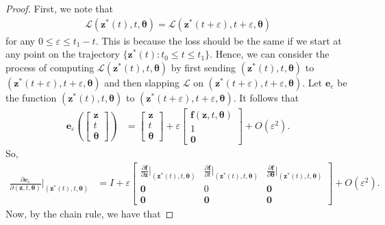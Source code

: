 \documentclass[10pt]{article}
\newcommand{\ve}[1]{\mathbf{#1}}
\newcommand{\ves}[1]{\boldsymbol{#1}}
\newcommand{\mcal}[1]{\mathcal{#1}}
\begin{document}
\begin{itemize}
\begin{proof}
    First, we note that
    \begin{align*}
      \mcal{L}(\ve{z}^*(t), t, \ves{\theta}) 
      = \mcal{L}(\ve{z}^*(t+\varepsilon), t + \varepsilon, \ves{\theta})
    \end{align*}
    for any $0 \leq \varepsilon \leq t_1 - t$. This is because the loss should be the same if we start at any point on the trajectory $\{ \ve{z}^*(t) : t_0 \leq t \leq t_1 \}$. Hence, we can consider the process of computing $\mcal{L}(\ve{z}^*(t), t, \ves{\theta})$ by first sending $(\ve{z}^*(t), t, \ves{\theta})$ to $(\ve{z}^*(t + \varepsilon), t + \varepsilon, \ves{\theta})$ and then slapping $\mcal{L}$ on $(\ve{z}^*(t + \varepsilon), t + \varepsilon, \ves{\theta})$. Let $\ve{e}_\varepsilon$ be the function $(\ve{z}^*(t), t, \ves{\theta})$ to $(\ve{z}^*(t + \varepsilon), t + \varepsilon, \ves{\theta})$. It follows that
    \begin{align*}
      \ve{e}_\varepsilon\left( \begin{bmatrix} \ve{z} \\ t \\ \ves{\theta} \end{bmatrix} \right)
      &= \begin{bmatrix} \ve{z} \\ t \\ \ves{\theta} \end{bmatrix} 
      + \varepsilon  \begin{bmatrix} \ve{f}(\ve{z}, t, \ves{\theta}) \\ 1 \\ \ve{0} \end{bmatrix} 
      + O(\varepsilon^2).
    \end{align*}
    So,
    \begin{align*}
      \frac{\partial \ve{e}_\varepsilon}{\partial (\ve{z}, t, \ves{\theta})}\bigg|_{(\ve{z}^*(t), t, \ves{\theta})}
      &= I + \varepsilon \begin{bmatrix}
        \frac{\partial \ve{f}}{\partial\ve{z}}\big|_{(\ve{z}^*(t), t, \ves{\theta})}
        & \frac{\partial \ve{f}}{\partial t}\big|_{(\ve{z}^*(t), t, \ves{\theta})}
        & \frac{\partial \ve{f}}{\partial \ves{\theta}}\big|_{(\ve{z}^*(t), t, \ves{\theta})} \\
        \ve{0} & 0 & \ve{0} \\
        \ve{0} & \ve{0} & \ve{0}
      \end{bmatrix}
      + O(\varepsilon^2).
    \end{align*}
    Now, by the chain rule, we have that

\end{proof}
\end{itemize}
\end{document}
